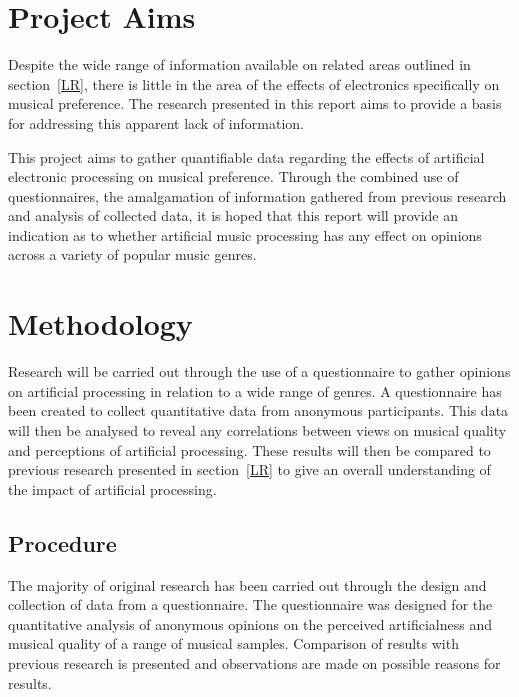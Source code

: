 \documentclass[titlepage]{scrartcl}
\begin{document}
    \section{Project Aims}
    Despite the wide range of information available on related areas outlined
    in section~\ref{LR}, there is little in the area of the effects of
    electronics specifically on musical preference. The research presented in
    this report aims to provide a basis for addressing this apparent lack of
    information.

    This project aims to gather quantifiable data regarding the effects of
    artificial electronic processing on musical preference. Through the
    combined use of questionnaires, the amalgamation of information gathered
    from previous research and analysis of collected data, it is hoped that
    this report will provide an indication as to whether artificial music
    processing has any effect on opinions across a variety of popular music
    genres. 

    \section{Methodology}
    Research will be carried out through the use of a questionnaire to gather
    opinions on artificial processing in relation to a wide range of genres.
    A questionnaire has been created to collect quantitative data from anonymous
    participants. This data will then be analysed to reveal any correlations
    between views on musical quality and perceptions of artificial processing.
    These results will then be compared to previous research presented in
    section~\ref{LR} to give an overall understanding of the impact of
    artificial processing.

    \subsection{Procedure}
    The majority of original research has been carried out through the design and
    collection of data from a questionnaire. The questionnaire was designed for
    the quantitative analysis of anonymous opinions on the perceived
    artificialness and musical quality of a range of musical samples.
    Comparison of results with previous research is presented and
    observations are made on possible reasons for results.
\end{document}
